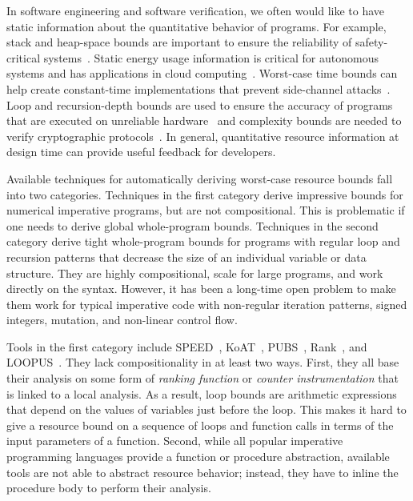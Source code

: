 \documentclass[nocopyrightspace,preprint,pldi]{sigplanconf-pldi15}
\begin{document}
In software engineering and software verification,
we often would like to have static information
about the quantitative behavior of programs.
For example, stack and heap-space bounds
are important to ensure the reliability of
safety-critical systems~\cite{Regehr05}.
Static energy usage information is critical
for autonomous systems and has applications in
cloud computing~\cite{CohenZSL12,CarrollH10}.
Worst-case time bounds can help create
constant-time implementations that prevent
side-channel attacks~\cite{KasperS09,BartheBCLP14}.
Loop and recursion-depth bounds are used to
ensure the accuracy of programs that are executed
on unreliable hardware~\cite{CarbinMR13} and
complexity bounds are needed to verify cryptographic
protocols~\cite{BartheGB09}.  In general, quantitative
resource information at design time can provide useful
feedback for developers.





Available techniques for automatically deriving worst-case resource bounds
fall into two categories.  Techniques
in the first category derive impressive bounds for
numerical imperative programs, but are not compositional.
This is problematic if one needs to derive global whole-program bounds.
Techniques in the second category derive tight whole-program
bounds for programs with regular loop and recursion patterns that
decrease the size of an individual variable or data structure.
They are highly compositional, scale for large
programs, and work directly on the syntax.  However, %
it has been
a long-time open problem to make them work for typical imperative code
with non-regular iteration patterns, signed integers, mutation, and non-linear
control flow. %

Tools in the first category include
SPEED~\cite{GulwaniMC09}, KoAT~\cite{BrockschmidtEFFG14},
PUBS~\cite{AlbertAGPZ12}, Rank~\cite{AliasDFG10},
and LOOPUS~\cite{SinnZV14}.
They lack compositionality in at least two ways.
First, they all base their analysis on some form of
\emph{ranking function} or \emph{counter instrumentation}
that is linked to a local analysis.  As a result, loop bounds are
arithmetic expressions that depend on the values of
variables just before the loop.
This makes it hard to give a
resource bound on a sequence of loops and function calls in
terms of the input parameters of a function.
Second, while all popular imperative programming languages
provide a function or procedure abstraction, available
tools are not able to abstract resource behavior;
instead, they have to inline the procedure body to perform their
analysis.
\end{document}
